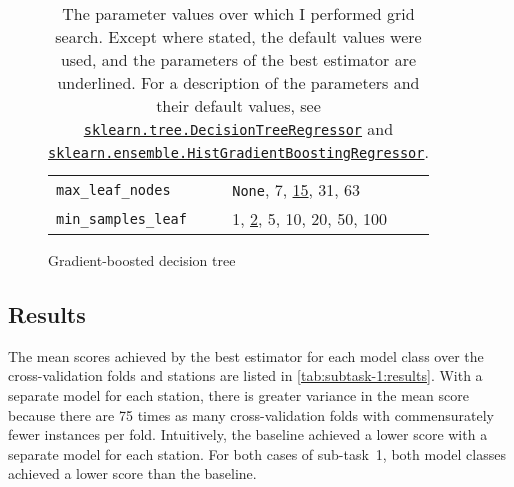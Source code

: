 \documentclass[11pt]{extarticle}
\newcommand{\None}{\texttt{None}}
\newcommand{\sklearn}[2]{\href{https://scikit-learn.org/stable/modules/generated/sklearn.#1.#2.html}{\lstinline|sklearn.#1.#2|}}
\begin{document}
\begin{table}
\begin{subfigure}{\textwidth}
\begin{tabular}{ll}
      \\
      \texttt{max\_leaf\_nodes}   & \None, 7, \underline{15}, 31, 63
      \\
      \texttt{min\_samples\_leaf} & 1, \underline{2}, 5, 10, 20, 50, 100
      \\
      \bottomrule
    \end{tabular}
    \caption{Gradient-boosted decision tree}
    \label{tab:chart-parameters-subtask-1-2}
  \end{subfigure}
  \caption{The parameter values over which I performed grid search.
    Except where stated, the default values were used, and the parameters of the best
    estimator are underlined.
    For a description of the parameters and their default values, see
    \sklearn{tree}{DecisionTreeRegressor} and
    \sklearn{ensemble}{HistGradientBoostingRegressor}.
  }
  \label{tab:chart-parameters-subtask-1}
\end{table}

\subsection{Results}
\label{sec:subtask-1:results}

The mean scores achieved by the best estimator for each model class over the
cross-validation folds and stations are listed in \cref{tab:subtask-1:results}.
With a separate model for each station, there is greater variance in the mean score
because there are 75 times as many cross-validation folds with commensurately fewer
instances per fold.
Intuitively, the baseline achieved a lower score with a separate model for each
station.
For both cases of sub-task~1, both model classes achieved a lower score than the
baseline.
\end{document}
